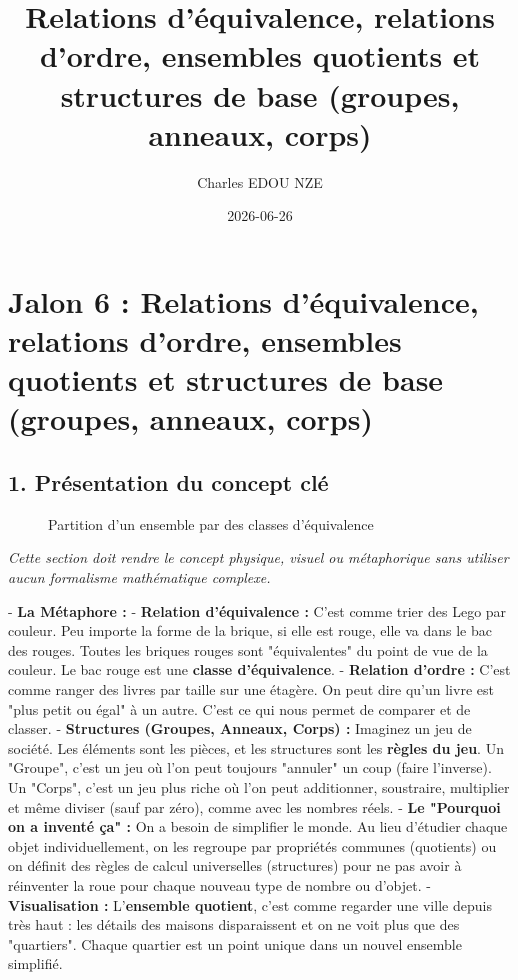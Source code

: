 \documentclass{report}
\title{Relations d'équivalence, relations d'ordre, ensembles quotients et structures de base (groupes, anneaux, corps)}
\author{Charles EDOU NZE}
\date{2026-06-26}
\begin{document}
\maketitle
\tableofcontents
\newpage

\chapter*{Jalon 6 : Relations d'équivalence, relations d'ordre, ensembles quotients et structures de base (groupes, anneaux, corps)}

\section*{1. Présentation du concept clé}

\begin{figure}[h]
\centering
{}
\caption{Partition d'un ensemble par des classes d'équivalence}
\end{figure}

\textit{Cette section doit rendre le concept physique, visuel ou métaphorique sans utiliser aucun formalisme mathématique complexe.}

- \textbf{La Métaphore :}
  - \textbf{Relation d'équivalence :} C'est comme trier des Lego par couleur. Peu importe la forme de la brique, si elle est rouge, elle va dans le bac des rouges. Toutes les briques rouges sont "équivalentes" du point de vue de la couleur. Le bac rouge est une \textbf{classe d'équivalence}.
  - \textbf{Relation d'ordre :} C'est comme ranger des livres par taille sur une étagère. On peut dire qu'un livre est "plus petit ou égal" à un autre. C'est ce qui nous permet de comparer et de classer.
  - \textbf{Structures (Groupes, Anneaux, Corps) :} Imaginez un jeu de société. Les éléments sont les pièces, et les structures sont les \textbf{règles du jeu}. Un "Groupe", c'est un jeu où l'on peut toujours "annuler" un coup (faire l'inverse). Un "Corps", c'est un jeu plus riche où l'on peut additionner, soustraire, multiplier et même diviser (sauf par zéro), comme avec les nombres réels.
- \textbf{Le "Pourquoi on a inventé ça" :} On a besoin de simplifier le monde. Au lieu d'étudier chaque objet individuellement, on les regroupe par propriétés communes (quotients) ou on définit des règles de calcul universelles (structures) pour ne pas avoir à réinventer la roue pour chaque nouveau type de nombre ou d'objet.
- \textbf{Visualisation :} L'\textbf{ensemble quotient}, c'est comme regarder une ville depuis très haut : les détails des maisons disparaissent et on ne voit plus que des "quartiers". Chaque quartier est un point unique dans un nouvel ensemble simplifié.
\end{document}
